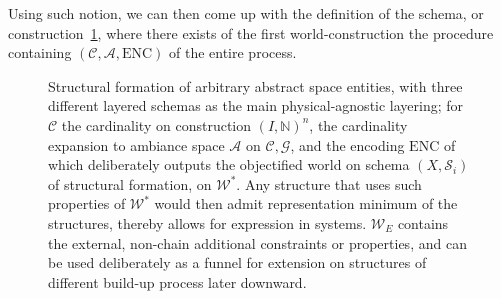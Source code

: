Using such notion, we can then come up with the definition of the schema, or construction~\ref{diag:based_construction}, where there exists of the first world-construction the procedure containing $(\mathcal{C},\mathcal{A},\mathrm{ENC})$ of the entire process. 

\begin{figure}[htb]
	\centering
	\caption{Structural formation of arbitrary abstract space entities, with three different layered schemas as the main physical-agnostic layering; for $\mathcal{C}$ the cardinality on construction $(I,\mathbb{N})^{n}$, the cardinality expansion to ambiance space $\mathcal{A}$ on $\mathcal{C},\mathcal{G}$, and the encoding $\mathrm{ENC}$ of which deliberately outputs the objectified world on schema $(X,\mathcal{S}_{i})$ of structural formation, on $\mathcal{W}^{*}$. Any structure that uses such properties of $\mathcal{W}^{*}$ would then admit representation minimum of the structures, thereby allows for expression in systems. $\mathcal{W}_{E}$ contains the external, non-chain additional constraints or properties, and can be used deliberately as a funnel for extension on structures of different build-up process later downward.}
	\label{diag:based_construction}
\end{figure}

